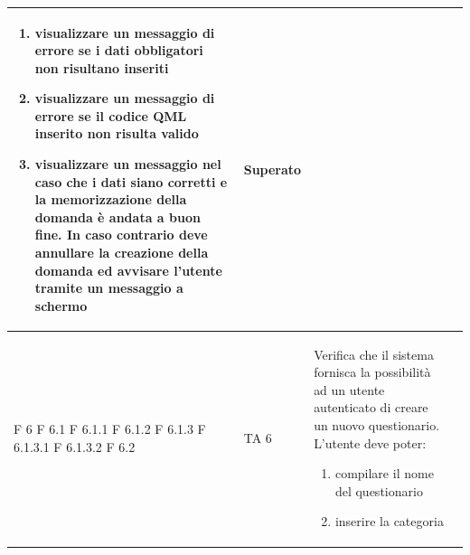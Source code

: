 \documentclass[a4paper,11pt]{article}
\begin{document}
\begin{longtable}{p{}p{}p{}p{}}
\begin{enumerate}
\item visualizzare un messaggio di errore se i dati obbligatori non risultano inseriti
\item visualizzare un messaggio di errore se il codice QML inserito non risulta valido
\item visualizzare un messaggio nel caso che i dati siano corretti e la memorizzazione della domanda è andata a buon fine. In caso contrario deve annullare la creazione della domanda ed avvisare l'utente tramite un messaggio a schermo
\end{enumerate} & Superato\\
\midrule
F 6 \newline F 6.1 \newline F 6.1.1 \newline F 6.1.2 \newline F 6.1.3 \newline F 6.1.3.1 \newline F 6.1.3.2 \newline F 6.2& TA 6& Verifica che il sistema fornisca la possibilità ad un utente autenticato di creare un nuovo questionario. \newline L'utente deve poter: 
\begin{enumerate}
\item compilare il nome del questionario
\item inserire la categoria

\end{enumerate}
\end{longtable}
\end{document}

